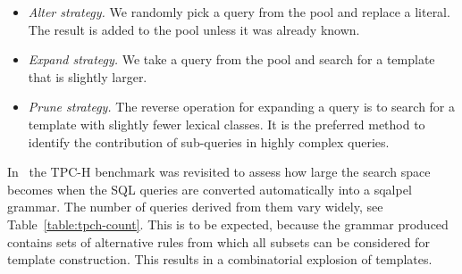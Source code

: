 \documentclass{cidr-2019}
\begin{document}
\begin{itemize}
\item{\emph{Alter strategy.\label{strategies}}}
We randomly pick a query from the pool and replace a literal. The
result is added to the pool unless it was already known.


\item{\emph{Expand strategy.}}  We take a query from the pool and
  search for a template that is slightly larger.

\item{\emph{Prune strategy.}}  The reverse operation for expanding a
  query is to search for a template with slightly fewer lexical
  classes.
It is the preferred method to identify the contribution of sub-queries
in highly complex queries.
\end{itemize}


In~\cite{DBLP:conf/sigmod/KerstenKZ18} the TPC-H benchmark was
revisited to assess how large the search space becomes when the SQL
queries are converted automatically into a {\sc sqalpel} grammar. The
number of queries derived from them vary widely, see
Table~\ref{table:tpch-count}.
This is to be expected, because the grammar produced contains sets of
alternative rules from which all subsets can be considered for template
construction. This results in a combinatorial explosion of templates.
\end{document}
